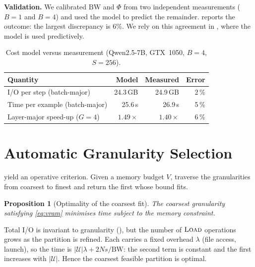 \documentclass[journal]{IEEEtran}
\newtheorem{proposition}[theorem]{Proposition}
\begin{document}
\textbf{Validation.} We calibrated $\mathrm{BW}$ and $\Phi$ from two independent measurements
($B=1$ and $B=4$) and used the model to predict the remainder.  reports the outcome:
the largest discrepancy is 6\%. We rely on this agreement in , where the model is
used predictively.

\begin{table}[t]
\centering
\caption{Cost model versus measurement (Qwen2.5-7B, GTX~1050, $B=4$, $S=256$).}
\label{tab:cost}
\footnotesize
\begin{tabular}{@{}lrrr@{}}
\toprule
\textbf{Quantity} & \textbf{Model} & \textbf{Measured} & \textbf{Error} \\
\midrule
I/O per step (batch-major)      & 24.3\,GB & 24.9\,GB & 2\,\% \\
Time per example (batch-major)  & 25.6\,s  & 26.9\,s  & 5\,\% \\
Layer-major speed-up ($G{=}4$)  & $1.49\times$ & $1.40\times$ & 6\,\% \\
\bottomrule
\end{tabular}
\end{table}

\section{Automatic Granularity Selection}
\label{sec:auto}

 yield an operative criterion. Given a memory budget $V$, traverse the
granularities from coarsest to finest and return the first whose bound fits.

\begin{proposition}[Optimality of the coarsest fit]
\label{prop:auto}
The coarsest granularity satisfying \eqref{eq:vram} minimises time subject to the memory
constraint.
\end{proposition}

\begin{IEEEproof}
Total I/O is invariant to granularity (), but the number of $\textsc{Load}$
operations grows as the partition is refined. Each carries a fixed overhead $\lambda$ (file access,
launch), so the time is $|\mathcal{U}|\lambda + 2Ns/\mathrm{BW}$: the second term is constant and
the first increases with $|\mathcal{U}|$. Hence the coarsest feasible partition is optimal.
\end{IEEEproof}
\end{document}
